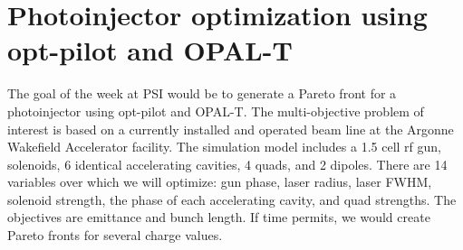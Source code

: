 \documentclass{article}     %
\begin{document}
	
\section{Photoinjector optimization using opt-pilot and OPAL-T}
	
The goal of the week at PSI would be to generate a Pareto front 
for a photoinjector using opt-pilot and OPAL-T. The multi-objective
problem of interest is based on a currently installed and operated 
beam line at the Argonne Wakefield Accelerator facility. The simulation
model includes a 1.5 cell rf gun, solenoids, 6 identical 
accelerating cavities, 4 quads, and 2 dipoles. 
There are 14 variables over which we will optimize: 
gun phase, laser radius, laser FWHM, solenoid strength, the phase 
of each accelerating cavity, and quad strengths. 
The objectives are emittance and bunch length.
If time permits, we would create Pareto fronts for several charge values.    
	
\end{document}
